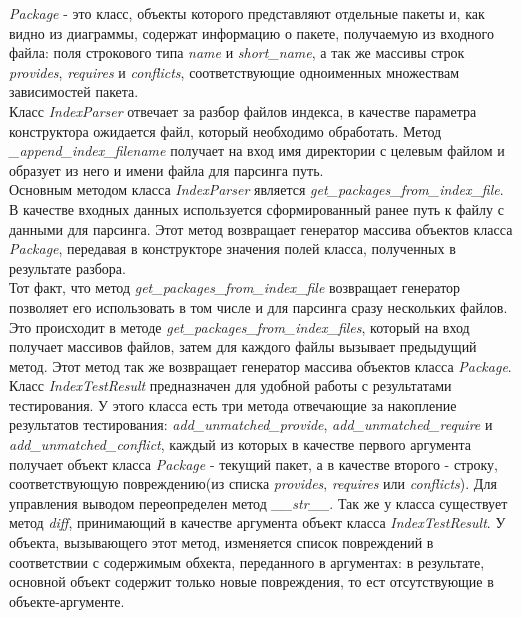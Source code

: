 \textit{Package} - это класс, объекты которого представляют отдельные пакеты и, как видно из диаграммы,
содержат информацию о пакете, получаемую из входного файла: поля строкового типа \textit{name} и 
\textit{short\_name}, а так же массивы строк \textit{provides}, \textit{requires}
и \textit{conflicts}, соответствующие одноименных множествам зависимостей пакета.
\\

Класс \textit{IndexParser} отвечает за разбор файлов индекса, в качестве параметра конструктора
ожидается файл, который необходимо обработать. Метод \textit{\_append\_index\_filename} получает на вход
имя директории с целевым файлом и образует из него и имени файла для парсинга
путь.\\
Основным методом класса \textit{IndexParser} является \textit{get\_packages\_from\_index\_file}.
В качестве входных данных используется сформированный ранее путь к файлу с данными
для парсинга. Этот метод возвращает генератор массива объектов класса \textit{Package},
передавая в конструкторе значения полей класса, полученных в результате разбора.\\

Тот факт, что метод \textit{get\_packages\_from\_index\_file} возвращает генератор позволяет
его использовать в том числе и для парсинга сразу нескольких файлов. Это происходит
в методе \textit{get\_packages\_from\_index\_files}, который на вход получает массивов файлов, 
затем для каждого файлы вызывает предыдущий метод. Этот метод так же возвращает
генератор массива объектов класса \textit{Package}.\\

Класс \textit{IndexTestResult} предназначен для удобной работы с результатами тестирования. 
У этого класса есть три метода отвечающие за накопление результатов тестирования:
\textit{add\_unmatched\_provide}, \textit{add\_unmatched\_require} и \textit{add\_unmatched\_conflict}, каждый из которых
в качестве первого аргумента получает объект класса \textit{Package} - текущий пакет, а в качестве второго
- строку, соответствующую повреждению(из списка \textit{provides}, \textit{requires} или \textit{conflicts}).
Для управления выводом переопределен метод \textit{\_\_str\_\_}. Так же у класса существует метод \textit{diff},
принимающий в качестве аргумента объект класса \textit{IndexTestResult}. У объекта, 
вызывающего этот метод, изменяется список повреждений в соответствии с содержимым обхекта,
переданного в аргументах: в результате, основной объект содержит только новые повреждения,
то ест отсутствующие в объекте-аргументе.\\

